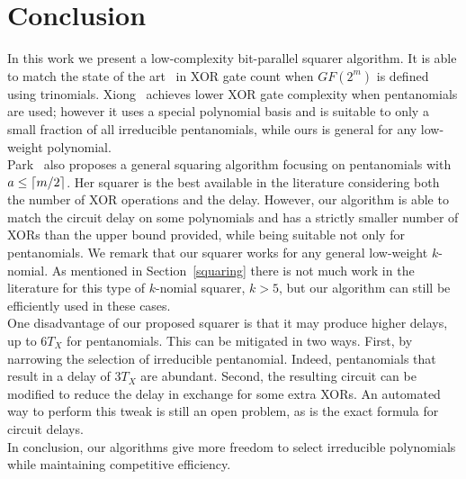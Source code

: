 
\section{Conclusion} \label{conclusion}

In this work we present a low-complexity bit-parallel squarer algorithm. It is able to match the state of the art~\cite{wu2002bit} in XOR gate count when $GF(2^m)$ is defined using trinomials. Xiong~\cite{xiong2014gf} achieves lower XOR gate complexity when pentanomials are used; however it uses a special polynomial basis and is suitable to only a small fraction of all irreducible pentanomials, while ours is general for any low-weight polynomial.\\

Park~\cite{park2012explicit} also proposes a general squaring algorithm focusing on pentanomials with $a \leq \lceil m/2\rceil$. Her squarer is the best available in the literature considering both the number of XOR operations and the delay. However, our algorithm is able to match the circuit delay on some polynomials and has a strictly smaller number of XORs than the upper bound provided, while being suitable not only for pentanomials. 
We remark that our squarer works for any general low-weight $k$-nomial. As mentioned in Section~\ref{squaring} there is not much work in the literature for this type of $k$-nomial squarer, $k>5$, but our algorithm can still be efficiently used in these cases.\\

One disadvantage of our proposed squarer is that it may produce higher delays, up to $6 T_X$ for pentanomials. This can be mitigated in two ways. First, by narrowing the selection of irreducible pentanomial. Indeed,  pentanomials that result in a delay of $3 T_X$ are abundant. Second, the resulting circuit can be modified to reduce the delay in exchange for some extra XORs. An automated way to perform this tweak is still an open problem, as is the exact formula for circuit delays.\\

In conclusion, our algorithms give more freedom to select irreducible polynomials while maintaining competitive efficiency.
